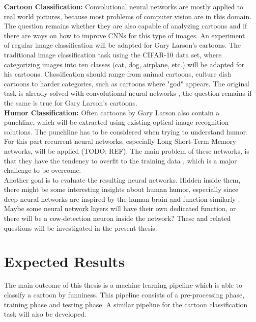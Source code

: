 \documentclass[draft,final]{vutinfth} %
\begin{document}
\textbf {Cartoon Classification:} \quad Convolutional neural networks are mostly applied to real world pictures, because most problems of computer vision are in this domain. The question remains whether they are also capable of analyzing cartoons and if there are ways on how to improve CNNs for this type of images. An experiment of regular image classification will be adapted for Gary Larson's cartoons. The traditional image classification task using the CIFAR-10 data set, where categorizing images into ten classes (cat, dog, airplane, etc.) will be adapted for his cartoons. Classification should range from animal cartoons, culture dish cartoons to harder categories, such as cartoons where "god" appears. The original task is already solved with convolutional neural networks \cite{dogsvscats}, the question remains if the same is true for Gary Larson's cartoons. \\

\textbf {Humor Classification:} \quad Often cartoons by Gary Larson also contain a punchline, which will be extracted using existing optical image recognition solutions. The punchline has to be considered when trying to understand humor. For this part recurrent neural networks, especially Long Short-Term Memory networks, will be applied (TODO: REF). The main problem of these networks, is that they have the tendency to overfit to the training data \cite[page 4]{reviewRNN}, which is a major challenge to be overcome. \\

Another goal is to evaluate the resulting neural networks. Hidden inside them, there might be some interesting insights about human humor, especially since deep neural networks are inspired by the human brain and function similarly \cite{Cichy2016}. Maybe some neural network layers will have their own dedicated function, or there will be a cow-detection neuron inside the network? These and related questions will be investigated in the present thesis.

\chapter{Expected Results}

The main outcome of this thesis is a machine learning pipeline which is able to classify a cartoon by funniness. This pipeline consists of a pre-processing phase, training phase and testing phase. A similar pipeline for the cartoon classification task will also be developed. \\
\end{document}

